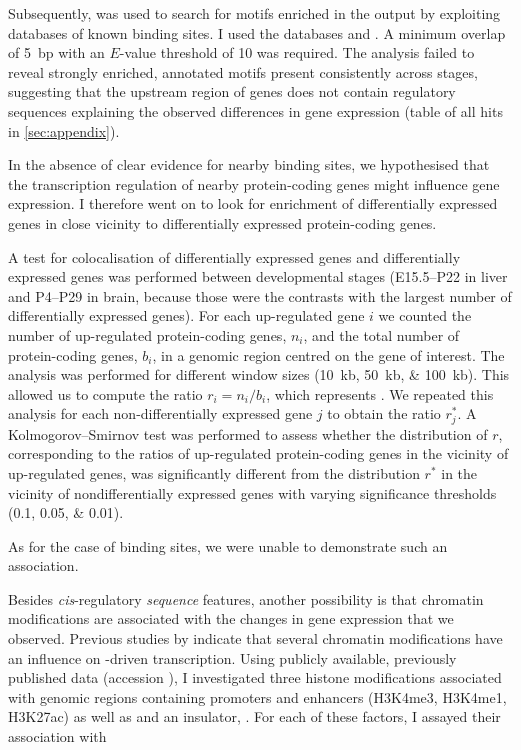 Subsequently,  \citep{Gupta:2007} was used to search for motifs
enriched in the  output by exploiting databases of known \tf binding
sites. I used the databases  and
. A minimum overlap of \SI{5}{bp} with an
\(E\)-value threshold of \num{10} was required. The analysis failed to reveal
strongly enriched, annotated motifs present consistently across stages,
suggesting that the upstream region of \trna genes does not contain regulatory
sequences explaining the observed differences in \trna gene expression (table of
all hits in \cref{sec:appendix}).

In the absence of clear evidence for nearby \tf binding sites, we hypothesised
that the transcription regulation of nearby protein-coding genes might influence
\trna gene expression. I therefore went on to look for enrichment of
differentially expressed \trna genes in close vicinity to differentially
expressed protein-coding genes.

A test for colocalisation of differentially expressed \trna genes and
differentially expressed \mrna genes was performed between developmental stages
(E15.5–P22 in liver and P4–P29 in brain, because those were the contrasts with
the largest number of differentially expressed \trna genes). For each
up-regulated \trna gene \(i\) we counted the number of up-regulated
protein-coding genes, \(n_i\), and the total number of protein-coding genes,
\(b_i\), in a genomic region centred on the \trna gene of interest. The analysis
was performed for different window sizes (\SIlist{10;50;100}{kb}). This allowed
us to compute the ratio \(r_i = {n_i}/{b_i}\), which represents . We
repeated this analysis for each non-differentially expressed \trna gene \(j\) to
obtain the ratio \(r_j^*\). A Kolmogorov–Smirnov test was performed to assess
whether the distribution of \(r\), corresponding to the ratios of up-regulated
protein-coding genes in the vicinity of up-regulated \trna genes, was
significantly different from the distribution \(r^*\) in the vicinity of
nondifferentially expressed \trna genes with varying significance thresholds
(\numlist{0.1;0.05;0.01}).

As for the case of \tf binding sites, we were unable to demonstrate such an
association.

Besides \emph{cis}-regulatory \emph{sequence} features, another possibility is
that chromatin modifications are associated with the changes in \trna gene
expression that we observed. Previous studies by \citet{Barski:2010,Oler:2010}
indicate that several chromatin modifications have an influence on -driven
transcription. Using publicly available, previously published data
\citep{Shen:2012} (\geo accession ), I investigated three
histone modifications associated with genomic regions containing promoters and
enhancers (H3K4me3, H3K4me1, H3K27ac) as well as  and an insulator, \ctcf.
For each of these factors, I assayed their association with

